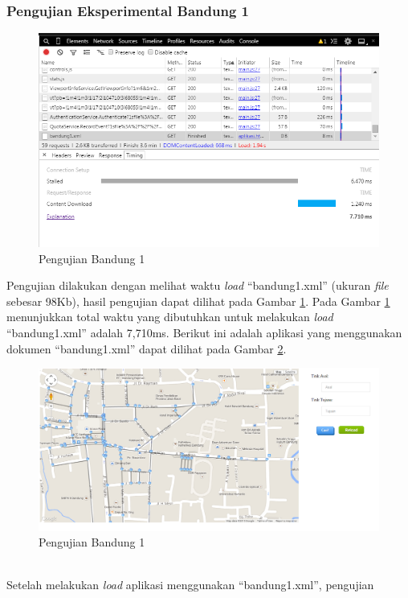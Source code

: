 \subsubsection{Pengujian Eksperimental Bandung 1}
\begin{figure}[h]
\centering
\includegraphics[scale=0.75]{Gambar/pu_bandung1}
\caption[Pengujian Bandung 1]{Pengujian Bandung 1}
\label{fig:pu_bandung1}
\end{figure}
Pengujian dilakukan dengan melihat waktu \textit{load} ``bandung1.xml''
(ukuran \textit{file} sebesar 98Kb), hasil pengujian dapat dilihat pada Gambar
\ref{fig:pu_bandung1}.
Pada Gambar \ref{fig:pu_bandung1} menunjukkan total waktu yang dibutuhkan untuk 
melakukan \textit{load} ``bandung1.xml'' adalah 7,710ms. Berikut ini
adalah aplikasi yang menggunakan dokumen ``bandung1.xml'' dapat dilihat pada
Gambar \ref{fig:bandung1_load}.
\begin{figure}[h]
\centering
\includegraphics[scale=0.45]{Gambar/bandung1_load}
\caption[Pengujian Bandung 1]{Pengujian Bandung 1}
\label{fig:bandung1_load}
\end{figure}\\
Setelah melakukan \textit{load} aplikasi menggunakan ``bandung1.xml'', pengujian
